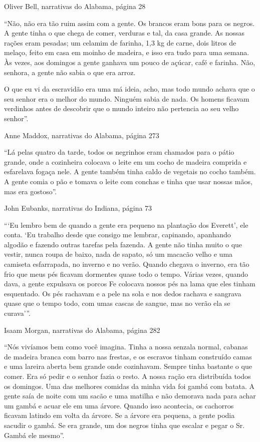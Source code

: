 Oliver Bell, narrativas do Alabama, página 28

``Não, não era tão ruim assim com a gente. Os brancos eram bons para os
negros. A gente tinha o que chega de comer, verduras e tal, da casa
grande. As nossas rações eram pesadas; um celamim de farinha, 1,3 kg de
carne, dois litros de melaço, feito em casa em moinho de madeira, e isso
era tudo para uma semana. Às vezes, aos domingos a gente ganhava um
pouco de açúcar, café e farinha. Não, senhora, a gente não sabia o que
era arroz.

O que eu vi da escravidão era uma má ideia, acho, mas todo mundo achava
que o seu senhor era o melhor do mundo. Ninguém sabia de nada. Os homens
ficavam verdinhos antes de descobrir que o mundo inteiro não pertencia
ao seu velho senhor''.

Anne Maddox, narrativas do Alabama, página 273

``Lá pelas quatro da tarde, todos os negrinhos eram chamados para o
pátio grande, onde a cozinheira colocava o leite em um cocho de madeira
comprida e esfarelava fogaça nele. A gente também tinha caldo de
vegetais no cocho também. A gente comia o pão e tomava o leite com
conchas e tinha que usar nossas mãos, mas era gostoso''.

John Eubanks, narrativas do Indiana, página 73

```Eu lembro bem de quando a gente era pequeno na plantação dos
Everett', ele conta. `Eu trabalho desde que consigo me lembrar,
capinando, apanhando algodão e fazendo outras tarefas pela fazenda. A
gente não tinha muito o que vestir, nunca roupa de baixo, nada de
sapato, só um macacão velho e uma camiseta esfarrapada, no inverno e no
verão. Quando chegava o inverno, era tão frio que meus pés ficavam
dormentes quase todo o tempo. Várias vezes, quando dava, a gente
expulsava os porcos Fe colocava nossos pés na lama que eles tinham
esquentado. Os pés rachavam e a pele na sola e nos dedos rachava e
sangrava quase que o tempo todo, com umas cascas de sangue, mas no verão
ela se curava'''.

Isaam Morgan, narrativas do Alabama, página 282

``Nós vivíamos bem como você imagina. Tinha a nossa senzala normal,
cabanas de madeira branca com barro nas frestas, e os escravos tinham
construído camas e uma lareira aberta bem grande onde cozinhavam. Sempre
tinha bastante o que comer. Era só pedir e o senhor fazia o resto. A
nossa ração era distribuída todos os domingos. Uma das melhores comidas
da minha vida foi gambá com batata. A gente saía de noite com um sacão e
uma matilha e não demorava nada para achar um gambá e acuar ele em uma
árvore. Quando isso acontecia, os cachorros ficavam latindo em volta da
árvore. Se a árvore era pequena, a gente podia sacudir o gambá. Se era
grande, um dos negros tinha que escalar e pegar o Sr. Gambá ele mesmo''.

